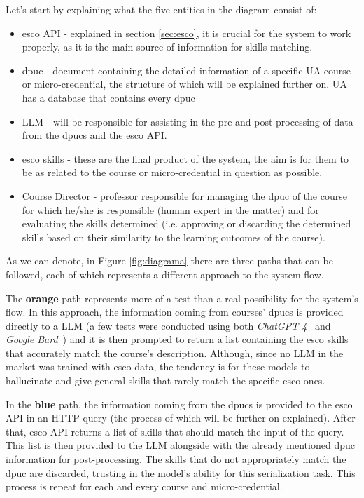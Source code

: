 Let's start by explaining what the five entities in the diagram consist of:
\begin{itemize}
   \item \ac{esco} API - explained in section \ref{sec:esco}, it is crucial for the system to work properly, as it is the main source of information for skills matching.
   \item \ac{dpuc} - document containing the detailed information of a specific UA course or micro-credential, the structure of which will be explained further on. UA has a database that contains every \ac{dpuc}
   \item LLM - will be responsible for assisting in the pre and post-processing of data from the \ac{dpuc}s and the \ac{esco} API.
   \item \ac{esco} skills - these are the final product of the system, the aim is for them to be as related to the course or micro-credential in question as possible.
   \item Course Director - professor responsible for managing the \ac{dpuc} of the course for which he/she is responsible (human expert in the matter) and for evaluating the skills determined (i.e. approving or discarding the determined skills based on their similarity to the learning outcomes of the course). 
\end{itemize}



As we can denote, in Figure \ref{fig:diagrama} there are three paths that can be followed, each of which represents a different approach to the system flow.

The \textbf{orange} path represents more of a test than a real possibility for the system's flow. In this approach, the information coming from courses’ \acp{dpuc} is provided directly to a LLM (a few tests were conducted using both \textit{ChatGPT 4}~\cite{chatgpt} and \textit{Google Bard}~\cite{bard}) and it is then prompted to return a list containing the \ac{esco} skills that accurately match the course’s description. Although, since no LLM in the market was trained with \ac{esco} data, the tendency is for these models to hallucinate and give general skills that rarely match the specific \ac{esco} ones.

In the \textbf{blue} path, the information coming from the \acp{dpuc} is provided to the \ac{esco} API in an HTTP query (the process of which will be further on explained). After that, \ac{esco} API returns a list of skills that should match the input of the query. This list is then provided to the LLM alongside with the already mentioned \acs{dpuc} information for post-processing. The skills that do not appropriately match the \acs{dpuc} are discarded, trusting in the model’s ability for this serialization task. This process is repeat for each and every course and micro-credential.

